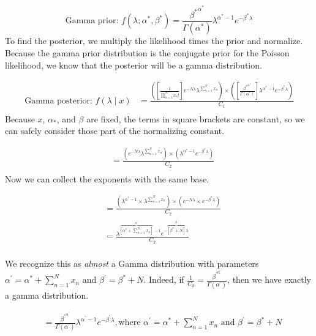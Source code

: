 \documentclass[
]{book}
\begin{document}
\[
\text{Gamma prior: } f( \lambda; \alpha^*, \beta^*) = \frac{{\beta^*}^{\alpha^*}}{\Gamma(\alpha^*)} \lambda^{\alpha^* - 1} e^{-\beta^*\lambda}
\]
To find the posterior, we multiply the likelihood times the prior and normalize. Because the gamma prior distribution is the conjugate prior for the Poisson likelihood, we know that the posterior will be a gamma distribution.

\[
\begin{aligned}
\text{Gamma posterior: } f( \lambda  \mid x) &= \frac{\left( \displaystyle \left[ \frac{1}{\prod_{n = 1}^N x_n !} \right]e^{-N\lambda}\lambda^{\sum_{n = 1}^N x_n}\right) \times \left( \left[ \frac{{\beta^*}^{\alpha^*}}{\Gamma(\alpha^*)} \right] \lambda^{\alpha^* - 1} e^{-\beta^*\lambda}\right)}{C_1} \\
\end{aligned}
\]
Because \(x\), \(\alpha_*\), and \(\beta\) are fixed, the terms in square brackets are constant, so we can safely consider those part of the normalizing constant.

\[
\begin{aligned}
&= \frac{\left( \displaystyle  e^{-N\lambda}\lambda^{\sum_{n = 1}^N x_n}\right) \times \left( \lambda^{\alpha^* - 1} e^{-\beta^*\lambda}\right)}{C_2} \\
\end{aligned}
\]
Now we can collect the exponents with the same base.

\[
\begin{aligned}
&= \frac{\left( \lambda^{\alpha^* - 1} \times \lambda^{\sum_{n = 1}^N x_n}\right) \times \left( \displaystyle  e^{-N\lambda} \times e^{-\beta^*\lambda} \right)}{C_2} \\
&= \frac{\lambda^{ \overbrace{\left[ \alpha^* + \sum_{n = 1}^N x_n \right]}^{\alpha^\prime} - 1}  e^{-\overbrace{[\beta^* + N]}^{\beta^\prime}\lambda} }{C_2} \\
\end{aligned}
\]

We recognize this as \emph{almost} a Gamma distribution with parameters \(\alpha^\prime = \alpha^* + \sum_{n = 1}^N x_n\) and \(\beta^\prime = \beta^* + N\). Indeed, if \(\frac{1}{C_2} = \frac{{\beta^\prime}^{\alpha^\prime}}{\Gamma(\alpha^{\prime})}\), then we have exactly a gamma distribution.

\[
\begin{aligned}
&= \frac{{\beta^\prime}^{\alpha^\prime}}{\Gamma(\alpha^{\prime})} \lambda^{ \alpha^\prime - 1}  e^{-\beta^\prime\lambda}, \text{where } \alpha^\prime = \alpha^* +  \sum_{n = 1}^N x_n \text{ and } \beta^\prime = \beta^* + N
\end{aligned}
\]
\end{document}
